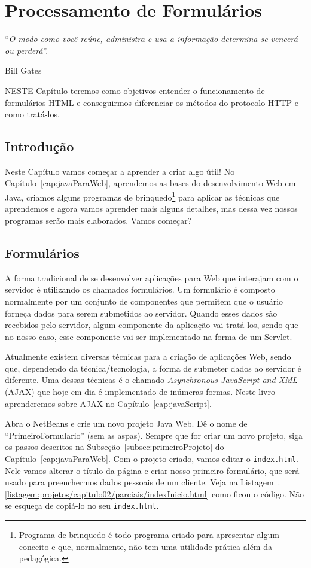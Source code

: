 \chapter{Processamento de Formulários}\label{cap:processamentoFormularios}
\epigraph{``\textit{O modo como você reúne, administra e usa a informação determina se vencerá ou perderá}''.}{Bill Gates}

\lettrine[lines=4, lhang=0.1, lraise=0, loversize=0.2, findent=0.1em]{\textcolor{corAzulTema}{N}}{ESTE} Capítulo teremos como objetivos entender o funcionamento de formulários HTML e conseguirmos diferenciar os métodos do protocolo HTTP e como tratá-los.


\section{Introdução}

Neste Capítulo vamos começar a aprender a criar algo útil! No Capítulo~\ref{cap:javaParaWeb}, aprendemos as bases do desenvolvimento Web em Java, criamos alguns programas de brinquedo\footnote{Programa de brinquedo é todo programa criado para apresentar algum conceito e que, normalmente, não tem uma utilidade prática além da pedagógica.} para aplicar as técnicas que aprendemos e agora vamos aprender mais alguns detalhes, mas dessa vez nossos programas serão mais elaborados. Vamos começar?


\section{Formulários}

A forma tradicional de se desenvolver aplicações para Web que interajam com o servidor é utilizando os chamados formulários. Um formulário é composto normalmente por um conjunto de componentes que permitem que o usuário forneça dados para serem submetidos ao servidor. Quando esses dados são recebidos pelo servidor, algum componente da aplicação vai tratá-los, sendo que no nosso caso, esse componente vai ser implementado na forma de um Servlet.

Atualmente existem diversas técnicas para a criação de aplicações Web, sendo que, dependendo da técnica/tecnologia, a forma de submeter dados ao servidor é diferente. Uma dessas técnicas é o chamado \textit{Asynchronous JavaScript and XML} (AJAX) que hoje em dia é implementado de inúmeras formas. Neste livro aprenderemos sobre AJAX no Capítulo~\ref{cap:javaScript}.

Abra o NetBeans e crie um novo projeto Java Web. Dê o nome de ``PrimeiroFormulario'' (sem as aspas). Sempre que for criar um novo projeto, siga os passos descritos na Subseção~\ref{subsec:primeiroProjeto} do Capítulo~\ref{cap:javaParaWeb}. Com o projeto criado, vamos editar o \texttt{index.html}. Nele vamos alterar o título da página e criar nosso primeiro formulário, que será usado para preenchermos dados pessoais de um cliente. Veja na Listagem~\thechapter.\ref{listagem:projetos/capitulo02/parciais/indexInicio.html} como ficou o código. Não se esqueça de copiá-lo no seu \texttt{index.html}.

